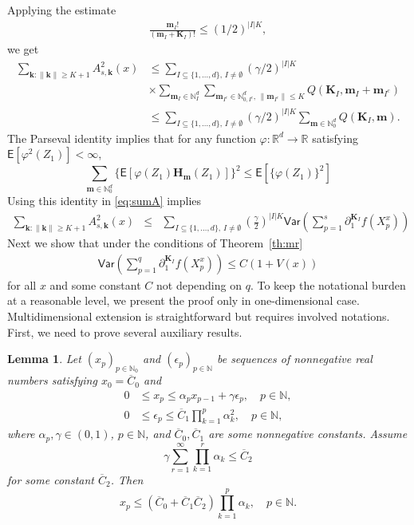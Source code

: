 \documentclass[bj]{imsart}
\def\PE{\mathsf{E}}
\def\PVar{\mathsf{Var}}
\def\nset{\mathbb{N}}
\def\rset{\mathbb{R}}
\def\rset{\mathbb{R}}
\newtheorem{lem}[thm]{Lemma}
\newcommand*{\ol}{\overline}
\begin{document}
Applying the estimate
\begin{eqnarray*}
\frac{\mathbf{m}_{I}!}{\left(\mathbf{m}_{I}+\mathbf{K}_{I}\right)!}\leq (1/2)^{|I| K},
\end{eqnarray*}
we get
\begin{align}
\label{eq:sumA}
\sum_{\mathbf{k}\colon\|\mathbf{k}\|\geq K+1}A^2_{s,\mathbf{k}}(x)
&\leq
\sum_{I\subseteq\{1,\ldots,d\},\, I\neq \emptyset} (\gamma/2)^{|I|K}
\\
\nonumber
& \times\sum_{\mathbf{m}_{I}\in\mathbb{N}_{I}^{d}} \sum_{\mathbf{m}_{I^c}\in \mathbb{N}^d_{0,I^c},\,\|\mathbf{m}_{I^c}\|\leq K} Q(\mathbf{\mathbf{K}}_{I},\mathbf{m}_{I}+\mathbf{m}_{I^c})
\\
\nonumber
&\leq
\sum_{I\subseteq\{1,\ldots,d\},\, I\neq \emptyset} (\gamma/2)^{|I|K} \sum_{\mathbf{m}\in\mathbb{N}_0^{d}} Q(\mathbf{\mathbf{K}}_{I},\mathbf{m}).
\end{align}
The Parseval identity implies that for any function $\varphi: \rset^d \to \rset$ satisfying $\PE[\varphi^2(Z_1)] < \infty$,
\[
\sum_{\mathbf{m}\in \nset^d_0} \{\PE[\varphi(Z_1) \mathbf{H}_\mathbf{m}(Z_1)] \}^2 \le \PE[\{\varphi(Z_1)\}^2]
\]
Using this identity in \eqref{eq:sumA} implies
\begin{eqnarray*}
\sum_{\mathbf{k}\colon\|\mathbf{k}\|\geq K+1}A^2_{s,\mathbf{k}}(x)
&\leq & \sum_{I\subseteq\{1,\ldots,d\},\, I\neq \emptyset}
\left(\frac{\gamma}{2}\right)^{|I|K}
\PVar\left(\sum_{p=1}^{s}\partial_{1}^{\mathbf{K}_I}f\left(X^x_{p}\right)
\right)
\end{eqnarray*}
Next we show that under the conditions  of Theorem~\ref{th:mr}
\begin{eqnarray*}
\PVar\left(\sum_{p=1}^{q}\partial_{1}^{\mathbf{K}_I}f\left(X^x_{p}\right)
\right)\leq C(1+V(x))
\end{eqnarray*}
for all $x$ and some constant $C$  not depending on $q.$
To keep the notational burden at a reasonable level, we present the proof only in one-dimensional case.
Multidimensional extension is straightforward but requires involved notations.
First, we need to prove several auxiliary results.
\begin{lem}\label{lem:06062018a1}
Let $(x_p)_{p\in\mathbb N_0}$
and $(\epsilon_p)_{p\in\mathbb N}$
be sequences of nonnegative real numbers
satisfying $x_0=\ol C_0$ and
\begin{align}
0&\le x_p\le\alpha_p x_{p-1}+\gamma \epsilon_p,\quad p\in\mathbb N,
\label{eq:06062018a1}\\
0&\le\epsilon_p\le\ol C_1\prod_{k=1}^p \alpha_k^2,\quad p\in\mathbb N,
\label{eq:06062018a2}
\end{align}
where $\alpha_p,\gamma\in(0,1)$, $p\in\mathbb N$,
and $\ol C_0,\ol C_1$ are some nonnegative constants. Assume
\begin{equation}\label{eq:06062018a3}
\gamma \sum_{r=1}^\infty \prod_{k=1}^r \alpha_k\le\ol C_2
\end{equation}
for some constant $\ol C_2$. Then
$$
x_p\le(\ol C_0+\ol C_1\ol C_2)\prod_{k=1}^p \alpha_k,\quad p\in\mathbb N.
$$
\end{lem}
\end{document}
